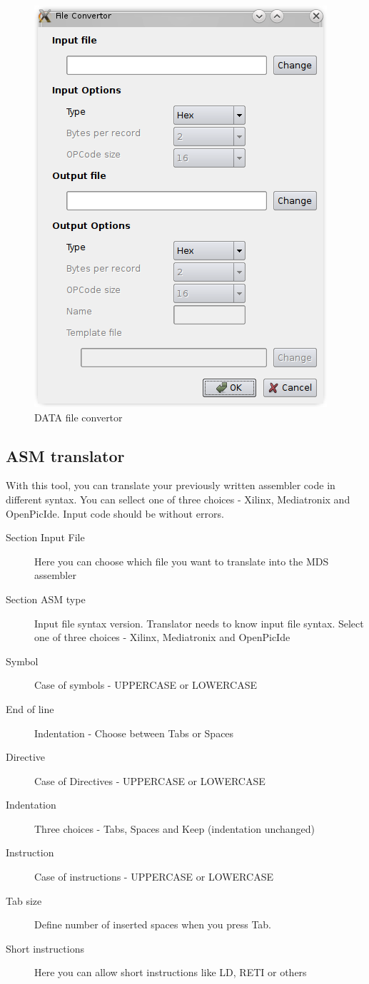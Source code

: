     \begin{figure}[h]
        \centering{}
        \includegraphics[width=.5\textwidth]{img/DATA_convertor.png}
        \caption{DATA file convertor}
    \end{figure}

\subsection{ASM translator}
    With this tool, you can translate your previously written assembler code in different syntax.
    You can sellect one of three choices - Xilinx, Mediatronix and OpenPicIde. Input code should be without
    errors.
    \begin{description}
        \item[Section Input File] Here you can choose which file you want to translate into the MDS assembler
        \item[Section ASM type] Input file syntax version. Translator needs to know input file syntax. Select one of three choices - Xilinx, Mediatronix and OpenPicIde
        \item[Symbol] Case of symbols - UPPERCASE or LOWERCASE
        \item[End of line] Indentation - Choose between Tabs or Spaces
        \item[Directive] Case of Directives - UPPERCASE or LOWERCASE
        \item[Indentation] Three choices - Tabs, Spaces and Keep (indentation unchanged)
        \item[Instruction] Case of instructions - UPPERCASE or LOWERCASE
        \item[Tab size]  Define number of inserted spaces when you press Tab.
        \item[Short instructions] Here you can allow short instructions like LD, RETI or others
    \end{description}

